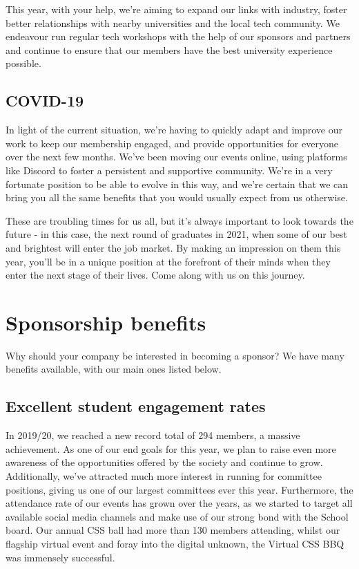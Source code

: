 \documentclass{article}
\begin{document}
\vspace{1cm}

This year, with your help, we're aiming to expand our links with industry, foster better relationships with nearby universities and the local tech community. We endeavour run regular tech workshops with the help of our sponsors and partners and continue to ensure that our members have the best university experience possible.

\vspace{1cm}

\subsection*{COVID-19}

In light of the current situation, we're having to quickly adapt and improve our work to keep our membership engaged, and provide opportunities for everyone over the next few months.
We've been moving our events online, using platforms like Discord to foster a persistent and supportive community.
We're in a very fortunate position to be able to evolve in this way, and we're certain that we can bring you all the same benefits that you would usually expect from us otherwise.

\vspace{1cm}

These are troubling times for us all, but it's always important to look towards the future - in this case, the next round of graduates in 2021, when some of our best and brightest will enter the job market.
By making an impression on them this year, you'll be in a unique position at the forefront of their minds when they enter the next stage of their lives.
Come along with us on this journey.

\newpage

\section*{Sponsorship benefits}

Why should your company be interested in becoming a sponsor?
We have many benefits available, with our main ones listed below.

\subsection*{Excellent student engagement rates}

In 2019/20, we reached a new record total of 294 members, a massive achievement. As one of our end goals for this year, we plan to raise even more awareness of the opportunities offered by the society and continue to grow.
Additionally, we've attracted much more interest in running for committee positions, giving us one of our largest committees ever this year.
Furthermore, the attendance rate of our events has grown over the years, as we started to target all available social media channels and make use of our strong bond with the School board.
Our annual CSS ball had more than 130 members attending, whilst our flagship virtual event and foray into the digital unknown, the Virtual CSS BBQ was immensely successful.
\end{document}
